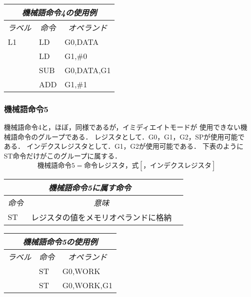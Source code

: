 \begin{center}
\tt\begin{tabular}{lll}
\hline
\multicolumn{3}{c}{\it 機械語命令4の使用例} \\
\hline
\multicolumn{1}{c}{\it ラベル} & 
        \multicolumn{1}{c}{\it 命令} & \multicolumn{1}{c}{\it オペランド} \\
L1  & LD  & G0,DATA \\
    & LD  & G1,\#0 \\
    & SUB & G0,DATA,G1 \\
    & ADD & G1,\#1 \\
\hline
\end{tabular}
\end{center}
\vspace{0.2cm}

\subsubsection{機械語命令5}
機械語命令4と，ほぼ，同様であるが，イミディエイトモードが
使用できない機械語命令のグループである．
レジスタとして．G0，G1，G2，SPが使用可能である．
インデクスレジスタとして．G1，G2が使用可能である．
下表のようにST命令だけがこのグループに属する．
\[ 機械語命令5 = 命令　レジスタ，式　[，インデクスレジスタ]\]
\begin{center}
\begin{tabular}{lll}
\hline
\multicolumn{2}{c}{\it 機械語命令5に属す命令} \\
\hline
\multicolumn{1}{c}{\it 命令} & \multicolumn{1}{c}{\it 意味} \\
ST & レジスタの値をメモリオペランドに格納 \\
\hline
\end{tabular}
\end{center}
\vspace{0.2cm}

\begin{center}
\tt\begin{tabular}{lll}
\hline
\multicolumn{3}{c}{\it 機械語命令5の使用例} \\
\hline
\multicolumn{1}{c}{\it ラベル} & 
        \multicolumn{1}{c}{\it 命令} & \multicolumn{1}{c}{\it オペランド} \\
  & ST & G0,WORK \\
  & ST & G0,WORK,G1 \\
\hline
\end{tabular}
\end{center}
\vspace{0.2cm}

